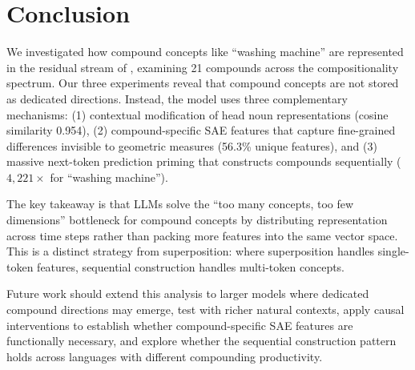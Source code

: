 \section{Conclusion}
\label{sec:conclusion}

We investigated how compound concepts like ``washing machine'' are represented in the residual stream of \gpttwo, examining 21 compounds across the compositionality spectrum.
Our three experiments reveal that compound concepts are not stored as dedicated directions.
Instead, the model uses three complementary mechanisms: (1) contextual modification of head noun representations (cosine similarity 0.954), (2) compound-specific SAE features that capture fine-grained differences invisible to geometric measures (56.3\% unique features), and (3) massive next-token prediction priming that constructs compounds sequentially ($4{,}221\times$ for ``washing machine'').

The key takeaway is that LLMs solve the ``too many concepts, too few dimensions'' bottleneck for compound concepts by distributing representation across time steps rather than packing more features into the same vector space.
This is a distinct strategy from superposition: where superposition handles single-token features, sequential construction handles multi-token concepts.

Future work should extend this analysis to larger models where dedicated compound directions may emerge, test with richer natural contexts, apply causal interventions to establish whether compound-specific SAE features are functionally necessary, and explore whether the sequential construction pattern holds across languages with different compounding productivity.
